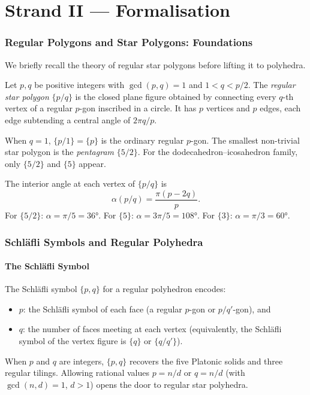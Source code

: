 \part*{Strand II — Formalisation}

\section{Regular Polygons and Star Polygons: Foundations}
\label{sec:star-polygons}

We briefly recall the theory of regular star polygons before
lifting it to polyhedra.

\begin{definition}
\label{def:star-polygon}
Let $p, q$ be positive integers with $\gcd(p,q)=1$ and $1 < q < p/2$.
The \emph{regular star polygon} \(\{p/q\}\) is the closed
plane figure obtained by connecting every $q$-th vertex of a
regular $p$-gon inscribed in a circle.  It has $p$ vertices
and $p$ edges, each edge subtending a central angle of
$2\pi q/p$.
\end{definition}

When $q=1$, $\{p/1\} = \{p\}$ is the ordinary regular
$p$-gon.  The smallest non-trivial star polygon is the
\emph{pentagram} \(\{5/2\}\).  For the dodecahedron–icosahedron
family, only $\{5/2\}$ and $\{5\}$ appear.

\begin{remark}
The interior angle at each vertex of \(\{p/q\}\) is
\[
  \alpha(p/q) = \frac{\pi(p-2q)}{p}.
\]
For \(\{5/2\}\): $\alpha = \pi/5 = 36°$.
For \(\{5\}\): $\alpha = 3\pi/5 = 108°$.
For \(\{3\}\): $\alpha = \pi/3 = 60°$.
\end{remark}

\section{Schläfli Symbols and Regular Polyhedra}
\label{sec:schlafli}

\subsection{The Schläfli Symbol}
\label{ssec:schlafli-symbol}

The Schläfli symbol \(\{p,q\}\) for a regular polyhedron
encodes:
\begin{itemize}
  \item \(p\): the Schläfli symbol of each face (a regular
        \(p\)-gon or \(p/q'\)-gon), and
  \item \(q\): the number of faces meeting at each vertex
        (equivalently, the Schläfli symbol of the vertex
        figure is \(\{q\}\) or \(\{q/q'\}\)).
\end{itemize}
When $p$ and $q$ are integers, \(\{p,q\}\) recovers the five
Platonic solids and three regular tilings.  Allowing rational
values \(p = n/d\) or \(q = n/d\) (with $\gcd(n,d)=1$,
$d>1$) opens the door to regular star polyhedra.

